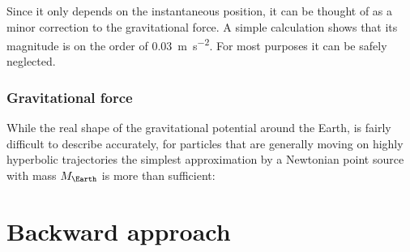             Since it only depends on the instantaneous position, it can be thought of as a minor correction to the
            gravitational force. A simple calculation shows that its magnitude is on the order
            of \SI{0.03}{\metre\per\second\squared}. For most purposes it can be safely neglected.

        \subsubsection{Gravitational force} \label{aafg}
            While the real shape of the gravitational potential around the Earth,
            is fairly difficult to describe accurately, for particles that are generally moving
            on highly hyperbolic trajectories the simplest approximation by a Newtonian point source
            with mass $M_\Earth$ is more than sufficient:

\section{Backward approach} \label{ab}

